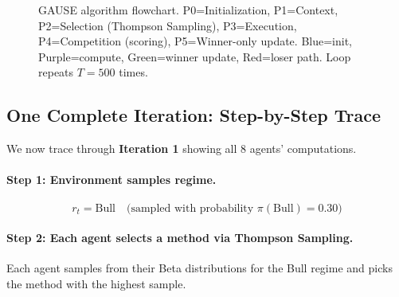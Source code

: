 \begin{figure}[h!]
    \caption{GAUSE algorithm flowchart. P0=Initialization, P1=Context, P2=Selection (Thompson Sampling), P3=Execution, P4=Competition (scoring), P5=Winner-only update. Blue=init, Purple=compute, Green=winner update, Red=loser path. Loop repeats $T=500$ times.}
    \label{fig:workflow}
\end{figure}


\subsection{One Complete Iteration: Step-by-Step Trace}

We now trace through \textbf{Iteration 1} showing all 8 agents' computations.

\paragraph{Step 1: Environment samples regime.}
\begin{equation}
r_t = \text{Bull} \quad \text{(sampled with probability } \pi(\text{Bull}) = 0.30\text{)}
\end{equation}

\paragraph{Step 2: Each agent selects a method via Thompson Sampling.}

Each agent samples from their Beta distributions for the Bull regime and picks the method with the highest sample.

